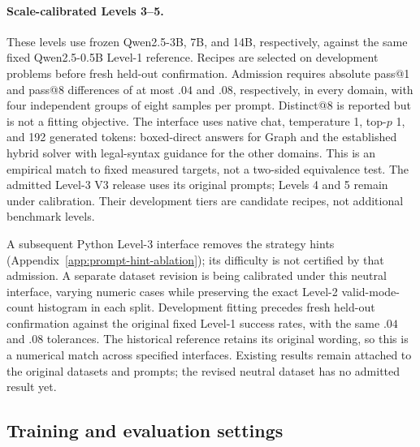 \documentclass{article}
\newcommand{\1}{\mathbf 1}
\theoremstyle{remark}
\theoremstyle{definition}
\theoremstyle{plain}
\begin{document}
\paragraph{Scale-calibrated Levels 3--5.}
These levels use frozen Qwen2.5-3B, 7B, and 14B, respectively, against the
same fixed Qwen2.5-0.5B Level-1 reference. Recipes are selected on development
problems before fresh held-out confirmation. Admission requires absolute
pass@1 and pass@8 differences of at most $.04$ and $.08$, respectively,
in every domain, with four independent groups of eight samples per prompt.
Distinct@8 is reported but is not a fitting objective. The interface uses
native chat, temperature 1, top-$p$ 1, and 192 generated tokens: boxed-direct
answers for Graph and the established hybrid solver with legal-syntax
guidance for the other domains. This is an empirical match to fixed measured
targets, not a two-sided equivalence test. The admitted Level-3 V3 release
uses its original prompts; Levels 4 and 5 remain under calibration.
Their development tiers are candidate recipes, not additional benchmark levels.

A subsequent Python Level-3 interface removes the strategy hints
(Appendix~\ref{app:prompt-hint-ablation}); its difficulty is not certified by
that admission. A separate dataset revision is being calibrated under this
neutral interface, varying numeric cases while preserving the exact Level-2
valid-mode-count histogram in each split. Development fitting precedes fresh
held-out confirmation against the original fixed Level-1 success rates,
with the same $.04$ and $.08$ tolerances. The historical reference retains
its original wording, so this is a numerical match across specified
interfaces. Existing results remain attached to the original datasets and
prompts; the revised neutral dataset has no admitted result yet.

\subsection{Training and evaluation settings}
\label{app:repro-run-contract}
\label{app:comparison-design}
\end{document}
